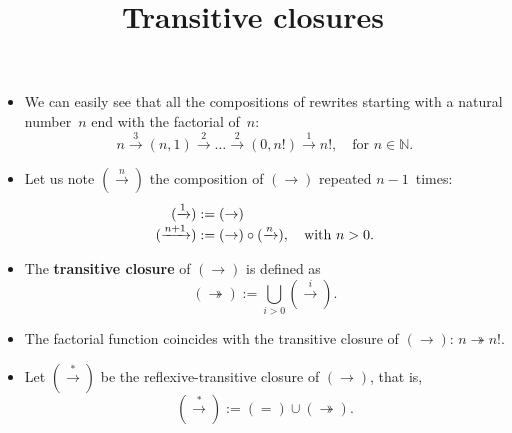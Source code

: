\documentclass[wide]{slides}
\begin{document}
\begin{slide}
  \title{Transitive closures}

  \begin{itemize}

    \item We can easily see that all the compositions of rewrites
      starting with a natural number~\(n\) end with the factorial
      of~\(n\):
      \smallskip
      \begin{equation*}
        n \xrightarrow{3} (n,1)
        \xrightarrow{2} \dots
        \xrightarrow{2} (0,n!)
        \xrightarrow{1}
        n!, \quad \text{for \(n \in \mathbb{N}\)}.
      \end{equation*}

    \item Let us note \((\xrightarrow{n})\) the composition of
      \((\rightarrow)\) repeated \(n-1\)~times:
      \begin{align*}
        (\xrightarrow{1})   &:= (\rightarrow)\\
        (\xrightarrow{\smash{n+1}}) & :=
        (\rightarrow) \circ (\xrightarrow{\smash{n}}),
        \quad\text{with \(n > 0\)}.
      \end{align*}

    \item The \textbf{transitive closure} of \((\rightarrow)\) is
      defined as
      \begin{equation*}
        (\twoheadrightarrow) := \bigcup_{i >
          0}{(\xrightarrow{i})}.
        \end{equation*}

    \item The factorial function coincides with the transitive closure
      of \((\rightarrow)\): \(n \twoheadrightarrow
      n!\).

    \item Let \((\xrightarrow{*})\) be the
      reflexive\hyp{}transitive closure of \((\rightarrow)\), that is,
      \begin{equation*}
        (\xrightarrow{*}) := (=) \cup (\twoheadrightarrow).
      \end{equation*}

  \end{itemize}

\end{slide}
\end{document}
